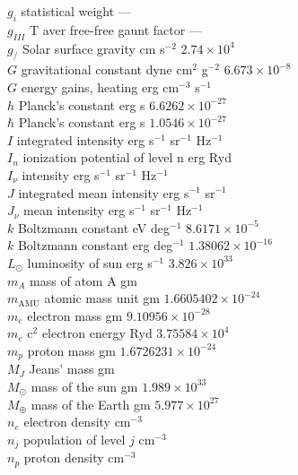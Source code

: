 \begin{tabbing}
$g_i$ \>  statistical weight \> ---\\
$g_{III}$ \>  T
aver free-free gaunt factor \> ---\\
$g_/$ \>  Solar surface gravity \>  cm
s$^{-2}$ \>  $2.74\times 10^4$\\
$G$ \> gravitational constant \>  dyne cm$^2$ g$^{-2}$ \>  $6.673\times 10^{-8}$\\
$G$ \>  energy gains,
heating \>  erg cm$^{-3}$ s$^{-1}$\\
$h$ \>  Planck's constant \>  erg s \>  $6.6262\times 10^{-27}$\\
$\hbar $ \>  Planck's constant \>  erg s \>   $1.0546\times 10^{-27}$\\
$I$ \>  integrated intensity \>  erg s$^{-1}$ sr$^{-1}$ Hz$^{-1}$\\
$I_n$ \>  ionization potential of level n \>   erg Ryd\\
$I_\nu$ \>  intensity \>  erg s$^{-1}$ sr$^{-1}$ Hz$^{-1}$\\
$J$ \>  integrated mean intensity \>  erg s$^{-1}$ sr$^{-1}$\\
$J_\nu$ \>  mean intensity \>  erg s$^{-1}$ sr$^{-1}$ Hz$^{-1}$\\
$k$ \>  Boltzmann constant \>  eV deg$^{-1}$ \> $8.6171\times 10^{-5}$\\
$k$ \>  Boltzmann constant \>  erg deg$^{-1}$ \>  $1.38062\times 10^{-16}$\\
$L_\odot$ \>  luminosity of sun \>  erg s$^{-1}$ \>  $3.826\times10^{33}$\\
$m_A$ \>  mass  of atom A \>  gm\\
$m_{\mathrm{AMU}}$ \>  atomic mass unit \>  gm \>  $1.6605402\times10^{-24}$\\
$m_e$ \>  electron mass \>  gm \>  $9.10956\times 10^{-28}$\\
$m_e$ c$^2$ \>  electron energy \>  Ryd \>  $3.75584\times10^4$\\
$m_p$ \>  proton mass \>  gm \>  $1.6726231\times 10^{-24}$\\
$M_J$ \>  Jeans' mass \>  gm\\
$M_\odot$ \>  mass of the sun \>  gm \>  $1.989\times 10^{33}$\\
$M_\oplus$ \>  mass of the Earth \>  gm \>  $5.977\times 10^{27}$\\
$n_e$ \>  electron
density \>  cm$^{-3}$\\
$n_j$ \>  population of level $j$ \>  cm$^{-3}$\\
$n_p$ \>  proton density \> cm$^{-3}$\\

\end{tabbing}
